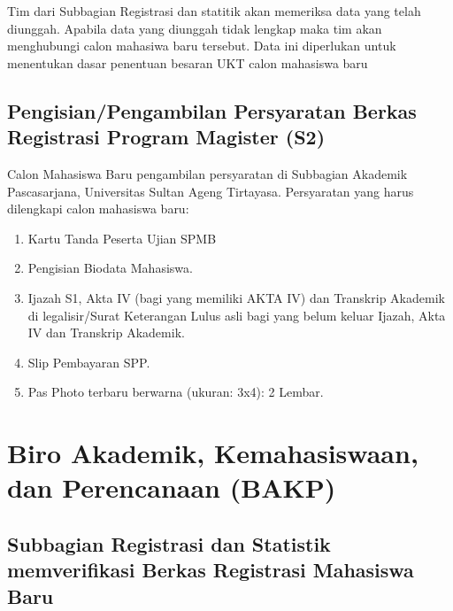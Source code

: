 \documentclass[
]{book}
\providecommand{\tightlist}{%
  \setlength{\itemsep}{0pt}\setlength{\parskip}{0pt}}
\begin{document}
Tim dari Subbagian Registrasi dan statitik akan memeriksa data yang telah diunggah. Apabila data yang diunggah tidak lengkap maka tim akan menghubungi calon mahasiwa baru tersebut. Data ini diperlukan untuk menentukan dasar penentuan besaran UKT calon mahasiswa baru

\hypertarget{pengisianpengambilan-persyaratan-berkas-registrasi-program-magister-s2}{%
\subsection{Pengisian/Pengambilan Persyaratan Berkas Registrasi Program Magister (S2)}\label{pengisianpengambilan-persyaratan-berkas-registrasi-program-magister-s2}}

Calon Mahasiswa Baru pengambilan persyaratan di Subbagian Akademik Pascasarjana, Universitas Sultan Ageng Tirtayasa. Persyaratan yang harus dilengkapi calon mahasiswa baru:

\begin{enumerate}
\def\labelenumi{\alph{enumi}.}
\tightlist
\item
  Kartu Tanda Peserta Ujian SPMB
\item
  Pengisian Biodata Mahasiswa.
\item
  Ijazah S1, Akta IV (bagi yang memiliki AKTA IV) dan Transkrip Akademik di legalisir/Surat Keterangan Lulus asli bagi yang belum keluar Ijazah, Akta IV dan Transkrip Akademik.
\item
  Slip Pembayaran SPP.\\
\item
  Pas Photo terbaru berwarna (ukuran: 3x4): 2 Lembar.
\end{enumerate}

\hypertarget{biro-akademik-kemahasiswaan-dan-perencanaan-bakp}{%
\section{Biro Akademik, Kemahasiswaan, dan Perencanaan (BAKP)}\label{biro-akademik-kemahasiswaan-dan-perencanaan-bakp}}

\hypertarget{subbagian-registrasi-dan-statistik-memverifikasi-berkas-registrasi-mahasiswa-baru}{%
\subsection{Subbagian Registrasi dan Statistik memverifikasi Berkas Registrasi Mahasiswa Baru}\label{subbagian-registrasi-dan-statistik-memverifikasi-berkas-registrasi-mahasiswa-baru}}
\end{document}
